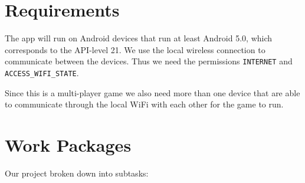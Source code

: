 \documentclass{sig-alternate}
\begin{document}
\section{Requirements}
The app will run on Android devices that run at least Android 5.0, which corresponds to the API-level 21. We use the local wireless connection to communicate between the devices. Thus we need the permissions \verb|INTERNET| and \verb|ACCESS_WIFI_STATE|.

Since this is a multi-player game we also need more than one device that are able to communicate through the local WiFi with each other for the game to run.

\section{Work Packages}
Our project broken down into subtasks:
\end{document}
